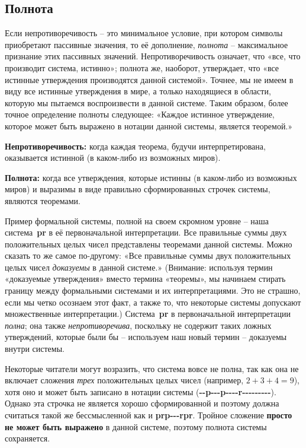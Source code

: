 \documentclass[../main.tex]{subfiles}
\begin{document}
\subsection{Полнота}

Если непротиворечивость \--- это минимальное условие, при котором символы приобретают пассивные значения, то её дополнение, \emph{полнота} \--- максимальное признание этих пассивных значений. Непротиворечивость означает, что «все, что производит система, истинно»; полнота же, наоборот, утверждает, что «все истинные утверждения производятся данной системой». Точнее, мы не имеем в виду все истинные утверждения в мире, а только находящиеся в области, которую мы пытаемся воспроизвести в данной системе. Таким образом, более точное определение полноты следующее: «Каждое истинное утверждение, которое может быть выражено в нотации данной системы, является теоремой.»

\begin{block}
    \textbf{Непротиворечивость:}
    когда каждая теорема, будучи интерпретирована, оказывается истинной (в каком-либо из возможных миров).

    \textbf{Полнота:}
    когда все утверждения, которые истинны (в каком-либо из возможных миров) и выразимы в виде правильно сформированных строчек системы, являются теоремами.
\end{block}

Пример формальной системы, полной на своем скромном уровне \--- наша система~\textbf{pr} в её первоначальной интерпретации. Все правильные суммы двух положительных целых чисел представлены теоремами данной системы. Можно сказать то же самое по-другому: «Все правильные суммы двух положительных целых чисел \emph{доказуемы} в данной системе.» (Внимание: используя термин «доказуемые утверждения» вместо термина «теоремы», мы начинаем стирать границу между формальными системами и их интерпретациями. Это не страшно, если мы четко осознаем этот факт, а также то, что некоторые системы допускают множественные интерпретации.) Система~\textbf{pr} в первоначальной интерпретации \emph{полна}; она также \emph{непротиворечива}, поскольку не содержит таких ложных утверждений, которые были бы \--- используем наш новый термин \--- доказуемы внутри системы.

Некоторые читатели могут возразить, что система вовсе не полна, так как она не включает сложения \emph{трех} положительных целых чисел (например, $2+3+4=9$), хотя оно и может быть записано в нотации системы (\textbf{-{}-p-{}-{}-p-{}-{}-{}-r-{}-{}-{}-{}-{}-{}-{}-{}-}). Однако эта строчка не является хорошо сформированной и поэтому должна считаться такой же бессмысленной как и \textbf{prp-{}-{}-rpr}. Тройное сложение \textbf{просто не может быть выражено} в данной системе, поэтому полнота системы сохраняется.
\end{document}
